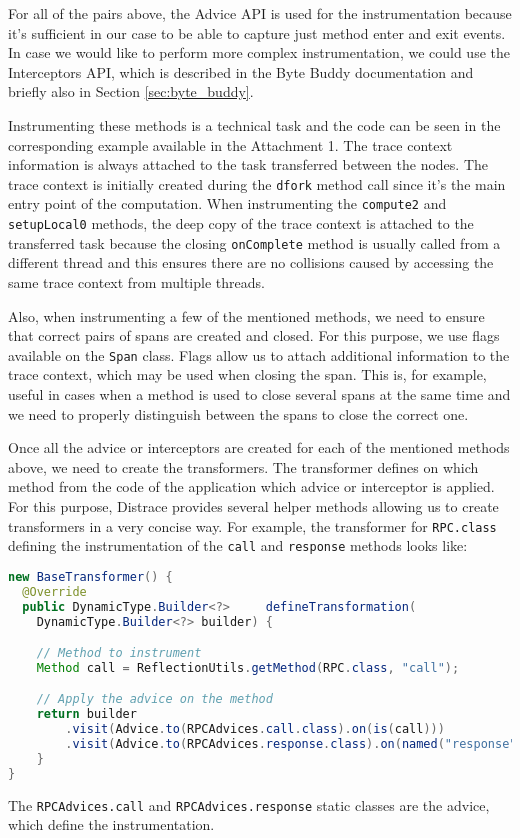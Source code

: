 For all of the pairs above, the Advice API is used for the instrumentation because it's sufficient in our case to be able to capture just method enter and exit events. In case we would like to perform more complex instrumentation, we could use the Interceptors API, which is described in the Byte Buddy documentation and briefly also in Section \ref{sec:byte_buddy}.

Instrumenting these methods is a technical task and the code can be seen in the corresponding example available in the Attachment 1. The trace context information is always attached to the task transferred between the nodes. The trace context is initially created during the \texttt{dfork} method call since it's the main entry point of the computation. When instrumenting the \texttt{compute2} and \texttt{setupLocal0} methods, the deep copy of the trace context is attached to the transferred task because the closing \texttt{onComplete} method is usually called from a different thread and this ensures there are no collisions caused by accessing the same trace context from multiple threads.

Also, when instrumenting a few of the mentioned methods, we need to ensure that correct pairs of spans are created and closed. For this purpose, we use flags available on the \texttt{Span} class. Flags allow us to attach additional information to the trace context, which may be used when closing the span. This is, for example, useful in cases when a method is used to close several spans at the same time and we need to properly distinguish between the spans to close the correct one.

Once all the advice or interceptors are created for each of the mentioned methods above, we need to create the transformers. The transformer defines on which method from the code of the application which advice or interceptor is applied. For this purpose, Distrace provides several helper methods allowing us to create transformers in a very concise way. For example, the transformer for \texttt{RPC.class} defining the instrumentation of the \texttt{call} and \texttt{response} methods looks like:

\begin{lstlisting}[language=Java]
new BaseTransformer() {
  @Override
  public DynamicType.Builder<?> 	defineTransformation(
    DynamicType.Builder<?> builder) {

    // Method to instrument
    Method call = ReflectionUtils.getMethod(RPC.class, "call");

    // Apply the advice on the method
    return builder
        .visit(Advice.to(RPCAdvices.call.class).on(is(call)))
        .visit(Advice.to(RPCAdvices.response.class).on(named("response")));
    }
}
\end{lstlisting}
The \texttt{RPCAdvices.call} and \texttt{RPCAdvices.response} static classes are the advice, which define the instrumentation.

